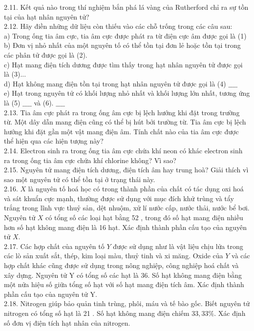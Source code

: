 \documentclass[10pt]{article}
\begin{document}
2.11. Kết quả nào trong thí nghiệm bắn phá lá vàng của Rutherford chỉ ra sự tồn tại của hạt nhân nguyên tử?\\
2.12. Hãy điền những dữ liệu còn thiếu vào các chỗ trống trong các câu sau:\\
a) Trong ống tia âm cực, tia âm cực được phát ra từ điện cực âm được gọi là (1)\\
b) Đơn vị nhỏ nhất của một nguyên tố có thể tồn tại đơn lẻ hoặc tồn tại trong các phân tử được gọi là (2).\\
c) Hạt mang điện tích dương được tìm thấy trong hạt nhân nguyên tử được gọi là (3)...\\
d) Hạt không mang điện tồn tại trong hạt nhân nguyên tử được gọi là (4) $\_\_\_\_$\\
e) Hạt trong nguyên tử có khối lượng nhỏ nhất và khối lượng lớn nhất, tương ứng là (5) $\_\_\_\_$ và (6). $\_\_\_\_$\\
2.13. Tia âm cực phát ra trong ống âm cực bị lệch hướng khi đặt trong trường từ. Một dây dẫn mang điện cũng có thể bị hút bởi trường từ. Tia âm cực bị lệch hướng khi đặt gần một vật mang điện âm. Tính chất nào của tia âm cực được thể hiện qua các hiện tượng này?\\
2.14. Electron sinh ra trong ống tia âm cực chứa khí neon có khác electron sinh ra trong ống tia âm cực chứa khí chlorine không? Vì sao?\\
2.15. Nguyên tử mang điện tích dương, điện tích âm hay trung hoà? Giải thích vì sao một nguyên tử có thể tồn tại ở trạng thái này.\\
2.16. $X$ là nguyên tố hoá học có trong thành phần của chất có tác dụng oxi hoá và sát khuẩn cực mạnh, thường được sử dụng với mục đích khử trùng và tẩy trắng trong lĩnh vực thuỷ sản, dệt nhuộm, xử lí nước cấp, nước thải, nước bể bơi. Nguyên tử $X$ có tổng số các loại hạt bằng 52 , trong đó số hạt mang điện nhiều hơn số hạt không mang điện là 16 hạt. Xác định thành phần cấu tạo của nguyên tử $X$.\\
2.17. Các hợp chất của nguyên tố $Y$ được sử dụng như là vật liệu chịu lửa trong các lò sản xuất sắt, thép, kim loại màu, thuỷ tinh và xi măng. Oxide của $Y$ và các hợp chất khác cũng được sử dụng trong nông nghiệp, công nghiệp hoá chất và xây dựng. Nguyên tử Y có tổng số các hạt là 36. Số hạt không mang điện bằng một nửa hiệu số giữa tổng số hạt với số hạt mang điện tích âm. Xác định thành phần cấu tạo của nguyên tử Y.\\
2.18. Nitrogen giúp bảo quản tinh trùng, phôi, máu và tế bào gốc. Biết nguyên tử nitrogen có tổng số hạt là 21 . Số hạt không mang điện chiếm $33,33 \%$. Xác định số đơn vị điện tích hạt nhân của nitrogen.\\
\end{document}
